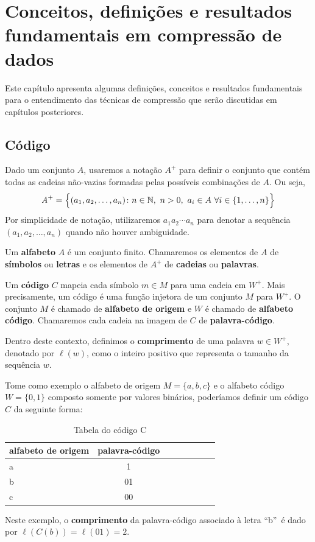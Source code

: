 \chapter{Conceitos, definições e resultados fundamentais em compressão de dados} \label{chapter:fund}

Este capítulo apresenta algumas definições, conceitos e resultados fundamentais para o entendimento das técnicas de compressão que serão discutidas em capítulos posteriores.

\section{Código}

Dado um conjunto $A$, usaremos a notação $A^+$ para definir o conjunto
que contém todas as cadeias não-vazias formadas pelas possíveis
combinações de $A$. Ou seja,
\begin{equation*}
  \emph{A}^+ = \Big\{
  (a_1,a_2,\dotsc, a_n) \colon n\in\mathbb{N}, \ n>0,
  \ a_i \in A \ \forall i \in \{1,\dotsc,n\} 
  \Big\}
\end{equation*}
Por simplicidade de notação, utilizaremos $a_1a_2\dotsm a_n$ para
denotar a sequência $(a_1,a_2,\dotsc, a_n)$ quando não houver
ambiguidade.

Um \textbf{alfabeto} $A$ é um conjunto finito. Chamaremos os elementos
de $A$ de \textbf{símbolos} ou \textbf{letras} e os elementos de $A^+$
de \textbf{cadeias} ou \textbf{palavras}.

Um \textbf{código} $C$ mapeia cada símbolo $m \in M$ para uma cadeia
em $W^+$. Mais precisamente, um código é uma função injetora de um
conjunto $M$ para $W^+$. O conjunto $M$ é chamado de \textbf{alfabeto
  de origem} e $W$ é chamado de \textbf{alfabeto código}. Chamaremos
cada cadeia na imagem de $C$ de \textbf{palavra-código}.

Dentro deste contexto, definimos o \textbf{comprimento} de uma palavra
$w\in W^+$, denotado por $\ell(w)$, como o inteiro positivo que
representa o tamanho da sequência $w$.

Tome como exemplo o alfabeto de origem $M = \{a, b, c\}$ e o alfabeto
código $W = \{0, 1\}$ composto somente por valores binários,
poderíamos definir um código $C$ da seguinte forma:

\begin{table}[!h]
   \centering
   \caption{Tabela do código C} \label{tab:vcode}
   \begin{tabular}{|l|c|c|c|c|c|c|r|}
        \hline
        \small{alfabeto de origem} & \small{palavra-código} \\ \hline
              a &   1   \\ \hline
              b &   01  \\ \hline
              c &   00  \\ \hline
  \end{tabular}
\end{table}
Neste exemplo, o \textbf{comprimento} da palavra-código associado à
letra ``b''~é dado por $\ell(C(b)) = \ell(01) = 2$.

